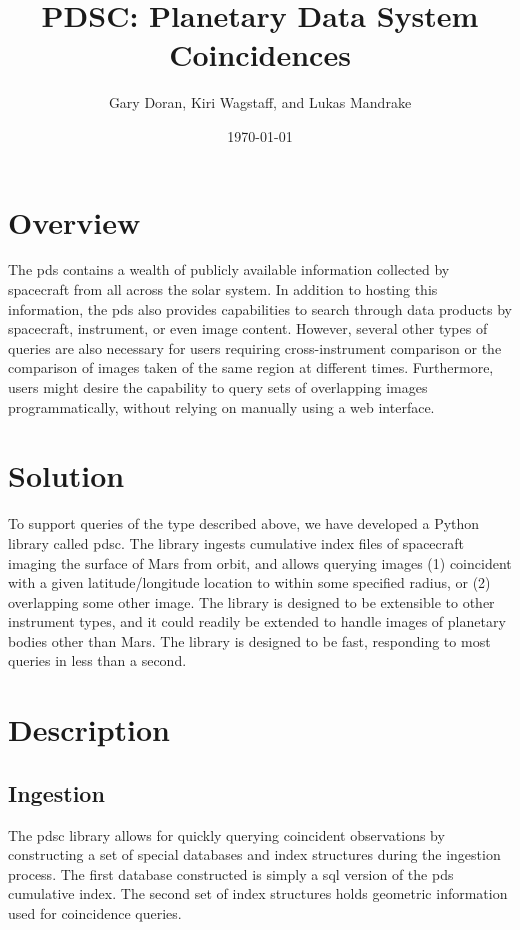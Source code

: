 \documentclass[twocolumn]{extarticle}
\title{
  PDSC: Planetary Data System Coincidences
}
\author{Gary Doran, Kiri Wagstaff, and Lukas Mandrake}
\date{\today}
\begin{document}
\maketitle

\section*{Overview}
The \ac{pds} contains a wealth of publicly available information collected by
spacecraft from all across the solar system. In addition to hosting this
information, the \ac{pds} also provides capabilities to search through data
products by spacecraft, instrument, or even image content. However, several
other types of queries are also necessary for users requiring cross-instrument
comparison or the comparison of images taken of the same region at different
times. Furthermore, users might desire the capability to query sets of
overlapping images programmatically, without relying on manually using a web
interface.

\section*{Solution}
To support queries of the type described above, we have developed a Python
library called \ac{pdsc}. The library ingests cumulative index files of
spacecraft imaging the surface of Mars from orbit, and allows querying images
(1) coincident with a given latitude/longitude location to within some
specified radius, or (2) overlapping some other image. The library is designed
to be extensible to other instrument types, and it could readily be extended to
handle images of planetary bodies other than Mars. The library is designed to
be fast, responding to most queries in less than a second.

\section*{Description}

\subsection*{Ingestion}
The \ac{pdsc} library allows for quickly querying coincident observations by
constructing a set of special databases and index structures during the
ingestion process. The first database constructed is simply a \ac{sql} version
of the \ac{pds} cumulative index. The second set of index structures holds geometric
information used for coincidence queries.
\end{document}
